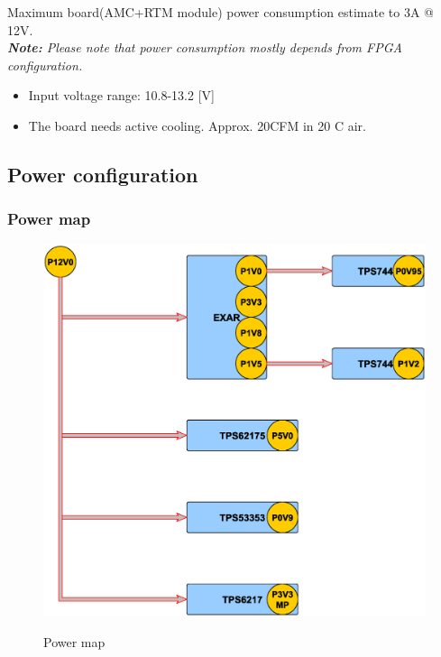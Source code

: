 Maximum board(AMC+RTM module) power consumption estimate to 3A @ 12V.\\

	\textit{\textbf{Note:} Please note that power consumption mostly depends from FPGA configuration. \\}

\begin{itemize}
 

\item Input voltage range: 10.8-13.2 [V]\\
\item The board needs active cooling. Approx. 20CFM in 20 C air.\\

\end{itemize}
\subsection{Power configuration} 

\subsubsection{Power map}


	\begin{figure}[htbp!]
		\centering
		\includegraphics[scale=0.3]{img/pwr.eps}\\
		\caption{Power map} 
	\end{figure}
\clearpage	

